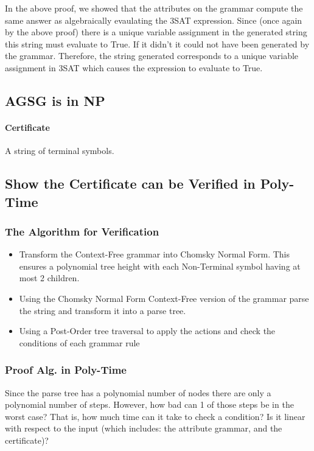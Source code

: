 In the above proof, we showed that the attributes on the grammar compute
the same answer as algebraically evaulating the 3SAT expression. Since
(once again by the above proof) there is a unique variable assignment in
the generated string this string must evaluate to True. If it didn't it
could not have been generated by the grammar. Therefore, the string
generated corresponds to a unique variable assignment in 3SAT which
causes the expression to evaluate to True.

\subsection{AGSG is in NP}

\paragraph{Certificate}

A string of terminal symbols.

\subsection{Show the Certificate can be Verified in Poly-Time}

\subsubsection{The Algorithm for Verification}

\begin{itemize}
\item
  Transform the Context-Free grammar into Chomsky Normal Form. This
  ensures a polynomial tree height with each Non-Terminal symbol having
  at most 2 children.
\item
  Using the Chomsky Normal Form Context-Free version of the grammar
  parse the string and transform it into a parse tree.
\item
  Using a Post-Order tree traversal to apply the actions and check the
  conditions of each grammar rule
\end{itemize}
\subsubsection{Proof Alg. in Poly-Time}

Since the parse tree has a polynomial number of nodes there are only a
polynomial number of steps. However, how bad can 1 of those steps be in
the worst case? That is, how much time can it take to check a condition?
Is it linear with respect to the input (which includes: the attribute
grammar, and the certificate)?

